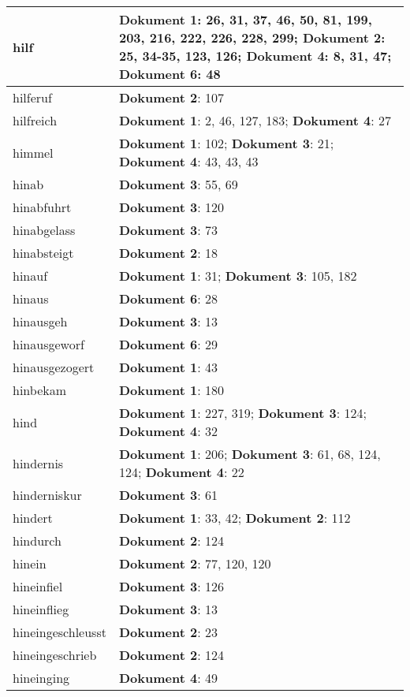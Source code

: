 \documentclass[a5paper]{article}
\begin{document}
\begin{longtable}[l]{|l|p{3in}|}
\hline
hilf & \textbf{Dokument 1}: 26, 31, 37, 46, 50, 81, 199, 203, 216, 222, 226, 228, 299; \textbf{Dokument 2}: 25, 34-35, 123, 126; \textbf{Dokument 4}: 8, 31, 47; \textbf{Dokument 6}: 48 \\
\hline
hilferuf & \textbf{Dokument 2}: 107 \\
\hline
hilfreich & \textbf{Dokument 1}: 2, 46, 127, 183; \textbf{Dokument 4}: 27 \\
\hline
himmel & \textbf{Dokument 1}: 102; \textbf{Dokument 3}: 21; \textbf{Dokument 4}: 43, 43, 43 \\
\hline
hinab & \textbf{Dokument 3}: 55, 69 \\
\hline
hinabfuhrt & \textbf{Dokument 3}: 120 \\
\hline
hinabgelass & \textbf{Dokument 3}: 73 \\
\hline
hinabsteigt & \textbf{Dokument 2}: 18 \\
\hline
hinauf & \textbf{Dokument 1}: 31; \textbf{Dokument 3}: 105, 182 \\
\hline
hinaus & \textbf{Dokument 6}: 28 \\
\hline
hinausgeh & \textbf{Dokument 3}: 13 \\
\hline
hinausgeworf & \textbf{Dokument 6}: 29 \\
\hline
hinausgezogert & \textbf{Dokument 1}: 43 \\
\hline
hinbekam & \textbf{Dokument 1}: 180 \\
\hline
hind & \textbf{Dokument 1}: 227, 319; \textbf{Dokument 3}: 124; \textbf{Dokument 4}: 32 \\
\hline
hindernis & \textbf{Dokument 1}: 206; \textbf{Dokument 3}: 61, 68, 124, 124; \textbf{Dokument 4}: 22 \\
\hline
hinderniskur & \textbf{Dokument 3}: 61 \\
\hline
hindert & \textbf{Dokument 1}: 33, 42; \textbf{Dokument 2}: 112 \\
\hline
hindurch & \textbf{Dokument 2}: 124 \\
\hline
hinein & \textbf{Dokument 2}: 77, 120, 120 \\
\hline
hineinfiel & \textbf{Dokument 3}: 126 \\
\hline
hineinflieg & \textbf{Dokument 3}: 13 \\
\hline
hineingeschleusst & \textbf{Dokument 2}: 23 \\
\hline
hineingeschrieb & \textbf{Dokument 2}: 124 \\
\hline
hineinging & \textbf{Dokument 4}: 49 \\

\end{longtable}
\end{document}
